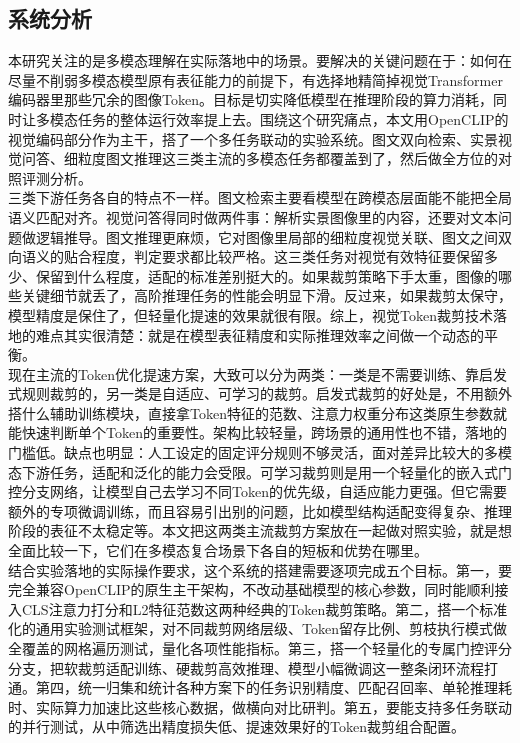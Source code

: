 \documentclass{article}
\begin{document}
{{{{{{{{{{{{		\subsection{系统分析}
		{\setlength{\parindent}{2em}\setlength{\baselineskip}{20pt}\selectfont
			本研究关注的是多模态理解在实际落地中的场景。要解决的关键问题在于：如何在尽量不削弱多模态模型原有表征能力的前提下，有选择地精简掉视觉Transformer编码器里那些冗余的图像Token。目标是切实降低模型在推理阶段的算力消耗，同时让多模态任务的整体运行效率提上去。围绕这个研究痛点，本文用OpenCLIP的视觉编码部分作为主干，搭了一个多任务联动的实验系统。图文双向检索、实景视觉问答、细粒度图文推理这三类主流的多模态任务都覆盖到了，然后做全方位的对照评测分析。\\
			三类下游任务各自的特点不一样。图文检索主要看模型在跨模态层面能不能把全局语义匹配对齐。视觉问答得同时做两件事：解析实景图像里的内容，还要对文本问题做逻辑推导。图文推理更麻烦，它对图像里局部的细粒度视觉关联、图文之间双向语义的贴合程度，判定要求都比较严格。这三类任务对视觉有效特征要保留多少、保留到什么程度，适配的标准差别挺大的。如果裁剪策略下手太重，图像的哪些关键细节就丢了，高阶推理任务的性能会明显下滑。反过来，如果裁剪太保守，模型精度是保住了，但轻量化提速的效果就很有限。综上，视觉Token裁剪技术落地的难点其实很清楚：就是在模型表征精度和实际推理效率之间做一个动态的平衡。\\
			现在主流的Token优化提速方案，大致可以分为两类：一类是不需要训练、靠启发式规则裁剪的，另一类是自适应、可学习的裁剪。启发式裁剪的好处是，不用额外搭什么辅助训练模块，直接拿Token特征的范数、注意力权重分布这类原生参数就能快速判断单个Token的重要性。架构比较轻量，跨场景的通用性也不错，落地的门槛低。缺点也明显：人工设定的固定评分规则不够灵活，面对差异比较大的多模态下游任务，适配和泛化的能力会受限。可学习裁剪则是用一个轻量化的嵌入式门控分支网络，让模型自己去学习不同Token的优先级，自适应能力更强。但它需要额外的专项微调训练，而且容易引出别的问题，比如模型结构适配变得复杂、推理阶段的表征不太稳定等。本文把这两类主流裁剪方案放在一起做对照实验，就是想全面比较一下，它们在多模态复合场景下各自的短板和优势在哪里。\\
			结合实验落地的实际操作要求，这个系统的搭建需要逐项完成五个目标。第一，要完全兼容OpenCLIP的原生主干架构，不改动基础模型的核心参数，同时能顺利接入CLS注意力打分和L2特征范数这两种经典的Token裁剪策略。第二，搭一个标准化的通用实验测试框架，对不同裁剪网络层级、Token留存比例、剪枝执行模式做全覆盖的网格遍历测试，量化各项性能指标。第三，搭一个轻量化的专属门控评分分支，把软裁剪适配训练、硬裁剪高效推理、模型小幅微调这一整条闭环流程打通。第四，统一归集和统计各种方案下的任务识别精度、匹配召回率、单轮推理耗时、实际算力加速比这些核心数据，做横向对比研判。第五，要能支持多任务联动的并行测试，从中筛选出精度损失低、提速效果好的Token裁剪组合配置。
}}}}}}}}}}}}}
\end{document}
